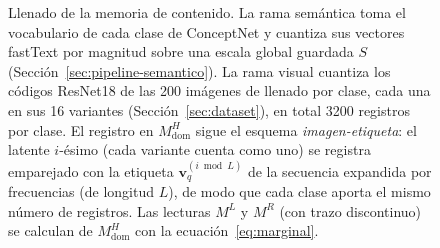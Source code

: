 \begin{figure}[H]
{%
}
\caption[Llenado de la memoria de contenido]{Llenado de la memoria de contenido.
La rama semántica toma el vocabulario de cada clase de ConceptNet y cuantiza sus
vectores fastText por magnitud sobre una escala global guardada $S$
(Sección~\ref{sec:pipeline-semantico}).
La rama visual cuantiza los códigos ResNet18 de las 200 imágenes de llenado por clase,
cada una en sus 16 variantes (Sección~\ref{sec:dataset}), en total 3200 registros por clase.
El registro en $M^H_{\mathrm{dom}}$ sigue el esquema \emph{imagen-etiqueta}:
el latente $i$-ésimo (cada variante cuenta como uno) se registra emparejado con la etiqueta
$\mathbf{v}_q^{(i \bmod L)}$ de la secuencia expandida por frecuencias
(de longitud $L$), de modo que cada clase aporta el mismo número de registros.
Las lecturas $M^L$ y $M^R$ (con trazo discontinuo) se calculan de $M^H_{\mathrm{dom}}$
con la ecuación~\eqref{eq:marginal}.}
\label{fig:arq-llenado}
\end{figure}

